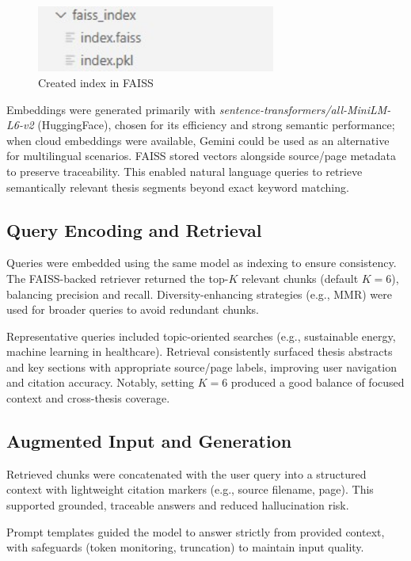 \begin{refsection}
\begin{figure}[h]
    \centering
    \includegraphics[width=0.7\textwidth]{figures/index.jpg}
    \caption{Created index in FAISS}
\end{figure}

Embeddings were generated primarily with \textit{sentence-transformers/all-MiniLM-L6-v2} (HuggingFace), chosen for its efficiency and strong semantic performance; when cloud embeddings were available, Gemini could be used as an alternative for multilingual scenarios. FAISS stored vectors alongside source/page metadata to preserve traceability. This enabled natural language queries to retrieve semantically relevant thesis segments beyond exact keyword matching.

\subsection{Query Encoding and Retrieval}
Queries were embedded using the same model as indexing to ensure consistency. The FAISS-backed retriever returned the top-$K$ relevant chunks (default $K=6$), balancing precision and recall. Diversity-enhancing strategies (e.g., MMR) were used for broader queries to avoid redundant chunks.

Representative queries included topic-oriented searches (e.g., sustainable energy, machine learning in healthcare). Retrieval consistently surfaced thesis abstracts and key sections with appropriate source/page labels, improving user navigation and citation accuracy. Notably, setting $K=6$ produced a good balance of focused context and cross-thesis coverage.

\subsection{Augmented Input and Generation}
Retrieved chunks were concatenated with the user query into a structured context with lightweight citation markers (e.g., source filename, page). This supported grounded, traceable answers and reduced hallucination risk.

Prompt templates guided the model to answer strictly from provided context, with safeguards (token monitoring, truncation) to maintain input quality.


\end{refsection}
